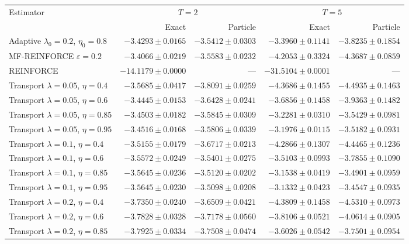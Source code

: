 \begin{table}[H]
\centering
\footnotesize
\setlength{\tabcolsep}{4pt}
\begin{tabular}{lrrrr}
\toprule
Estimator & \multicolumn{2}{c}{$T=2$} & \multicolumn{2}{c}{$T=5$} \\
\cmidrule(lr){2-3} \cmidrule(lr){4-5}
 & Exact & Particle & Exact & Particle \\
\midrule
Adaptive $\lambda_0=0.2$, $\eta_0=0.8$ & $-3.4293\pm0.0165$ & $-3.5412\pm0.0303$ & $-3.3960\pm0.1141$ & $-3.8235\pm0.1854$ \\
MF-REINFORCE $\varepsilon=0.2$ & $-3.4066\pm0.0219$ & $-3.5583\pm0.0232$ & $-4.2053\pm0.3324$ & $-4.3687\pm0.0859$ \\
REINFORCE & $-14.1179\pm0.0000$ & --- & $-31.5104\pm0.0001$ & --- \\
Transport $\lambda=0.05$, $\eta=0.4$ & $-3.5685\pm0.0417$ & $-3.8091\pm0.0259$ & $-4.3686\pm0.1455$ & $-4.4935\pm0.1463$ \\
Transport $\lambda=0.05$, $\eta=0.6$ & $-3.4445\pm0.0153$ & $-3.6428\pm0.0241$ & $-3.6856\pm0.1458$ & $-3.9363\pm0.1482$ \\
Transport $\lambda=0.05$, $\eta=0.85$ & $-3.4503\pm0.0182$ & $-3.5845\pm0.0309$ & $-3.2281\pm0.0310$ & $-3.5429\pm0.0981$ \\
Transport $\lambda=0.05$, $\eta=0.95$ & $-3.4516\pm0.0168$ & $-3.5806\pm0.0339$ & $-3.1976\pm0.0115$ & $-3.5182\pm0.0931$ \\
Transport $\lambda=0.1$, $\eta=0.4$ & $-3.5155\pm0.0179$ & $-3.6717\pm0.0213$ & $-4.2866\pm0.1307$ & $-4.4465\pm0.1236$ \\
Transport $\lambda=0.1$, $\eta=0.6$ & $-3.5572\pm0.0249$ & $-3.5401\pm0.0275$ & $-3.5103\pm0.0993$ & $-3.7855\pm0.1090$ \\
Transport $\lambda=0.1$, $\eta=0.85$ & $-3.5645\pm0.0236$ & $-3.5120\pm0.0202$ & $-3.1538\pm0.0419$ & $-3.4901\pm0.0959$ \\
Transport $\lambda=0.1$, $\eta=0.95$ & $-3.5645\pm0.0230$ & $-3.5098\pm0.0208$ & $-3.1332\pm0.0423$ & $-3.4547\pm0.0935$ \\
Transport $\lambda=0.2$, $\eta=0.4$ & $-3.7350\pm0.0240$ & $-3.6509\pm0.0421$ & $-4.3809\pm0.1458$ & $-4.5310\pm0.0973$ \\
Transport $\lambda=0.2$, $\eta=0.6$ & $-3.7828\pm0.0328$ & $-3.7178\pm0.0560$ & $-3.8106\pm0.0521$ & $-4.0614\pm0.0905$ \\
Transport $\lambda=0.2$, $\eta=0.85$ & $-3.7925\pm0.0334$ & $-3.7508\pm0.0474$ & $-3.6026\pm0.0542$ & $-3.7501\pm0.0954$ \\

\end{tabular}
\end{table}
